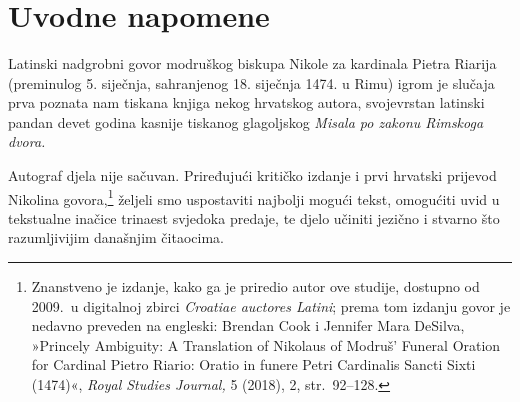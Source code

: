 \documentclass[a5paper,twoside]{article}
\renewcommand\Large{\fontsize{12.5}{13} \selectfont}
\begin{document}


\frenchspacing

\fontsize{11}{13.2}
\selectfont

\linespread{1.1}

\setlength{\parindent}{7mm}

\setcounter{page}{169}

\title{\Large{\MakeUppercase{Govor za Pietra Riarija (1474)}}}

\date{}%

\maketitle 

\thispagestyle{empty}

\section{Uvodne napomene}

Latinski nadgrobni govor modruškog biskupa Nikole za kardinala Pietra Riarija (preminulog 5. siječnja, sahranjenog 18. siječnja 1474. u Rimu) igrom je slučaja prva poznata nam tiskana knjiga nekog hrvatskog autora, svojevrstan latinski pandan devet godina kasnije tiskanog glagoljskog \textit{Misala po zakonu Rimskoga dvora.}

Autograf djela nije sačuvan. Priređujući kritičko izdanje i prvi hrvatski prijevod Nikolina govora,\footnote{Znanstveno je izdanje, kako ga je priredio autor ove studije, dostupno od 2009.\ u digitalnoj zbirci \textit{\textlatin{Croatiae auctores Latini}}; prema tom izdanju govor je nedavno preveden na engleski: Brendan Cook i Jennifer Mara DeSilva, »Princely Ambiguity: A Translation of Nikolaus of Modruš’ Funeral Oration for Cardinal Pietro Riario: Oratio in funere Petri Cardinalis Sancti Sixti (1474)«, \textit{Royal Studies Journal,} 5 (2018), 2, str.~92–128.} željeli smo uspostaviti najbolji mogući tekst, omogućiti uvid u tekstualne inačice trinaest svjedoka predaje, te djelo učiniti jezično i stvarno što razumljivijim današnjim čitaocima.
\end{document}
